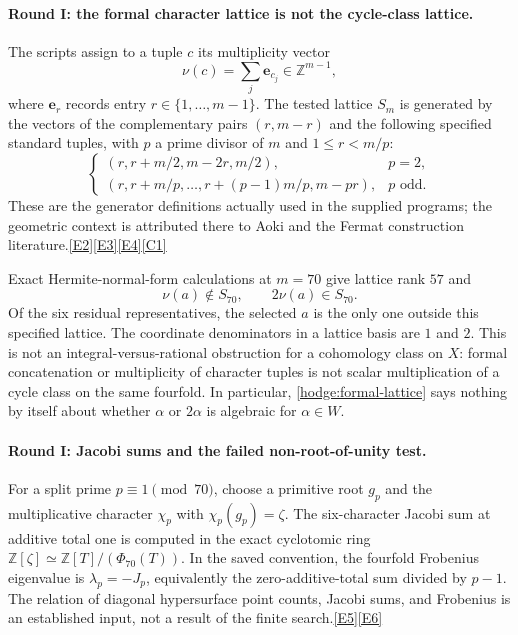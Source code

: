 \documentclass[11pt]{article}
\newcommand{\Z}{\mathbb Z}
\newcommand{\src}[1]{\hyperlink{src:#1}{[#1]}}
\begin{document}
\paragraph{Round I: the formal character lattice is not the cycle-class lattice.}
The scripts assign to a tuple $c$ its multiplicity vector
\[
 \nu(c)=\sum_{j}\mathbf e_{c_j}\in\Z^{m-1},
\]
where $\mathbf e_r$ records entry $r\in\{1,\ldots,m-1\}$. The tested lattice
$S_m$ is generated by the vectors of the complementary pairs $(r,m-r)$ and
the following specified standard tuples, with $p$ a prime divisor of $m$ and
$1\le r<m/p$:
\[
 \begin{cases}
 (r,r+m/2,m-2r,m/2),&p=2,\\
 (r,r+m/p,\ldots,r+(p-1)m/p,m-pr),&p\text{ odd}.
 \end{cases}
\]
These are the generator definitions actually used in the supplied programs;
the geometric context is attributed there to Aoki and the Fermat
construction literature.\src{E2}\src{E3}\src{E4}\src{C1}

Exact Hermite-normal-form calculations at $m=70$ give lattice rank $57$ and
\begin{equation}\label{hodge:formal-lattice}
 \nu(a)\notin S_{70},\qquad 2\nu(a)\in S_{70}.
\end{equation}
Of the six residual representatives, the selected $a$ is the only one outside
this specified lattice. The coordinate denominators in a lattice basis are
$1$ and $2$. This is not an integral-versus-rational obstruction for a
cohomology class on $X$: formal concatenation or multiplicity of character
tuples is not scalar multiplication of a cycle class on the same fourfold.
In particular, \eqref{hodge:formal-lattice} says nothing by itself about
whether $\alpha$ or $2\alpha$ is algebraic for $\alpha\in W$.

\paragraph{Round I: Jacobi sums and the failed non-root-of-unity test.}
For a split prime $p\equiv1\pmod{70}$, choose a primitive root $g_p$ and the
multiplicative character $\chi_p$ with $\chi_p(g_p)=\zeta$. The six-character
Jacobi sum at additive total one is computed in the exact cyclotomic ring
$\Z[\zeta]\simeq\Z[T]/(\Phi_{70}(T))$. In the saved convention, the
fourfold Frobenius eigenvalue is $\lambda_p=-J_p$, equivalently the
zero-additive-total sum divided by $p-1$. The relation of diagonal
hypersurface point counts, Jacobi sums, and Frobenius is an established input,
not a result of the finite search.\src{E5}\src{E6}
\end{document}
